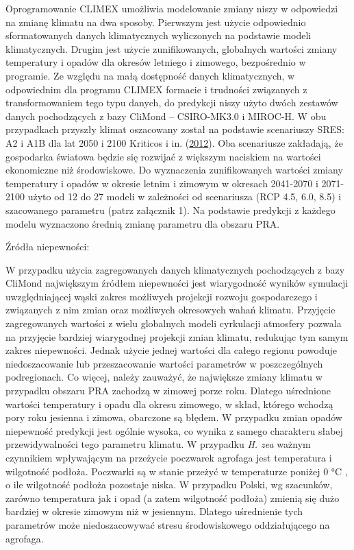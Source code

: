 \documentclass[polish,a4paper]{article}
\begin{document}
Oprogramowanie CLIMEX umożliwia modelowanie zmiany niszy w odpowiedzi na
zmianę klimatu na dwa sposoby. Pierwszym jest użycie odpowiednio
sformatowanych danych klimatycznych wyliczonych na podstawie modeli
klimatycznych. Drugim jest użycie zunifikowanych, globalnych wartości
zmiany temperatury i opadów dla okresów letniego i zimowego,
bezpośrednio w programie. Ze względu na małą dostępność danych
klimatycznych, w odpowiednim dla programu CLIMEX formacie i trudności
związanych z transformowaniem tego typu danych, do predykcji niszy użyto
dwóch zestawów danych pochodzących z bazy CliMond -- CSIRO-MK3.0 i
MIROC-H. W obu przypadkach przyszły klimat oszacowany został na
podstawie scenariuszy SRES: A2 i A1B dla lat 2050 i 2100 Kriticos i in.
(\protect\hyperlink{ref-kriticos2012}{2012}). Oba scenariusze zakładają,
że gospodarka światowa będzie się rozwijać z większym naciskiem na
wartości ekonomiczne niż środowiskowe. Do wyznaczenia zunifikowanych
wartości zmiany temperatury i opadów w okresie letnim i zimowym w
okresach 2041-2070 i 2071-2100 użyto od 12 do 27 modeli w zależności od
scenariusza (RCP 4.5, 6.0, 8.5) i szacowanego parametru (patrz załącznik
1). Na podstawie predykcji z każdego modelu wyznaczono średnią zmianę
parametru dla obszaru PRA.

Źródła niepewności:

W przypadku użycia zagregowanych danych klimatycznych pochodzących z
bazy CliMond największym źródłem niepewności jest wiarygodność wyników
symulacji uwzględniającej wąski zakres możliwych projekcji rozwoju
gospodarczego i związanych z nim zmian oraz możliwych okresowych wahań
klimatu. Przyjęcie zagregowanych wartości z wielu globalnych modeli
cyrkulacji atmosfery pozwala na przyjęcie bardziej wiarygodnej projekcji
zmian klimatu, redukując tym samym zakres niepewności. Jednak użycie
jednej wartości dla całego regionu powoduje niedoszacowanie lub
przeszacowanie wartości parametrów w poszczególnych podregionach. Co
więcej, należy zauważyć, że największe zmiany klimatu w przypadku
obszaru PRA zachodzą w zimowej porze roku. Dlatego uśrednione wartości
temperatury i opadu dla okresu zimowego, w skład, którego wchodzą pory
roku jesienna i zimowa, obarczone są błędem. W przypadku zmian opadów
niepewność predykcji jest ogólnie wysoka, co wynika z samego charakteru
słabej przewidywalności tego parametru klimatu. W przypadku \emph{H.
zea} ważnym czynnikiem wpływającym na przeżycie poczwarek agrofaga jest
temperatura i wilgotność podłoża. Poczwarki są w stanie przeżyć w
temperaturze poniżej 0 °C , o ile wilgotność podłoża pozostaje niska. W
przypadku Polski, wg szacunków, zarówno temperatura jak i opad (a zatem
wilgotność podłoża) zmienią się dużo bardziej w okresie zimowym niż w
jesiennym. Dlatego uśrednienie tych parametrów może niedoszacowywać
stresu środowiskowego oddziałującego na agrofaga.
\end{document}
